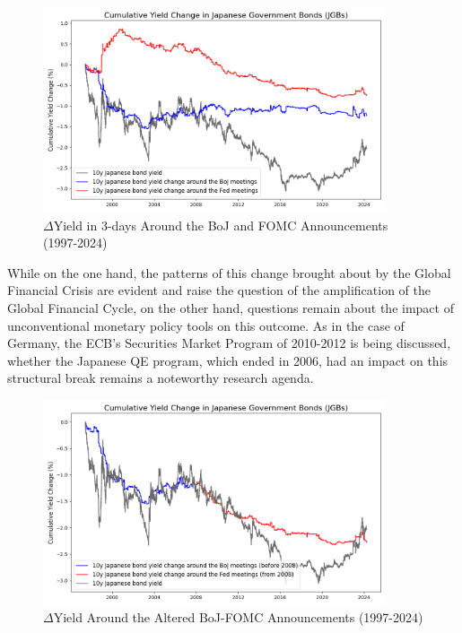 \begin{figure}[!htbp]
    \centering
     \caption{$\Delta$Yield in 3-days Around the BoJ and FOMC Announcements (1997-2024)}   \includegraphics[width=0.9\textwidth]{figures/1997_japanese_bonds_figure1a.png}

    \label{fig:boj1997}
\end{figure}

While on the one hand, the patterns of this change brought about by the Global Financial Crisis are evident and raise the question of the amplification of the Global Financial Cycle, on the other hand, questions remain about the impact of unconventional monetary policy tools on this outcome. As in the case of Germany, the ECB's Securities Market Program of 2010-2012 is being discussed, whether the Japanese QE program, which ended in 2006, had an impact on this structural break remains a noteworthy research agenda.



\begin{figure}[!htbp]
    \centering
    \caption{$\Delta$Yield Around the Altered BoJ-FOMC Announcements (1997-2024)} \includegraphics[width=0.9\textwidth]{figures/1997_japanese_mixed.png}

    \label{fig:boj97mix}
\end{figure}


